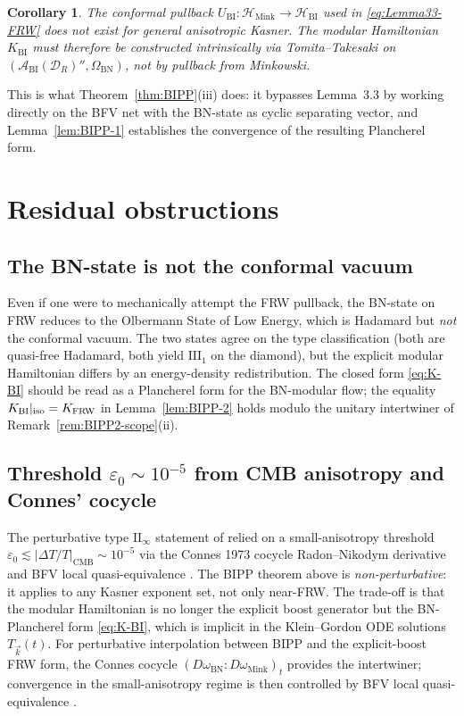 \documentclass[11pt,a4paper]{article}
\newtheorem{corollary}[theorem]{Corollary}
\theoremstyle{definition}
\newcommand{\cA}{\mathcal{A}}
\newcommand{\cH}{\mathcal{H}}
\newcommand{\cD}{\mathcal{D}}
\newcommand{\Mink}{\mathrm{Mink}}
\newcommand{\BI}{\mathrm{BI}}
\newcommand{\FRW}{\mathrm{FRW}}
\newcommand{\BN}{\mathrm{BN}}
\begin{document}
\begin{corollary}\label{cor:no-pullback}
The conformal pullback $U_\BI : \cH_\Mink \to \cH_\BI$ used in
\eqref{eq:Lemma33-FRW} does not exist for general anisotropic Kasner.
The modular Hamiltonian $K_\BI$ must therefore be constructed
intrinsically via Tomita--Takesaki on $(\cA_\BI(\cD_R)'',\Omega_\BN)$,
not by pullback from Minkowski.
\end{corollary}

This is what Theorem~\ref{thm:BIPP}(iii) does: it bypasses Lemma~3.3 by
working directly on the BFV net with the BN-state as cyclic separating
vector, and Lemma~\ref{lem:BIPP-1} establishes the convergence of the
resulting Plancherel form.

\section{Residual obstructions}\label{sec:obstructions}

\subsection{The BN-state is not the conformal vacuum}
Even if one were to mechanically attempt the FRW pullback, the BN-state
on FRW reduces to the Olbermann State of Low Energy, which is Hadamard but
\emph{not} the conformal vacuum. The two states agree on the type
classification (both are quasi-free Hadamard, both yield $\mathrm{III}_1$
on the diamond), but the explicit modular Hamiltonian differs by an
energy-density redistribution. The closed form \eqref{eq:K-BI} should be
read as a Plancherel form for the BN-modular flow; the equality
$K_\BI|_{\rm iso}=K_\FRW$ in Lemma~\ref{lem:BIPP-2} holds modulo the
unitary intertwiner of Remark~\ref{rem:BIPP2-scope}(ii).

\subsection{Threshold $\varepsilon_0 \sim 10^{-5}$ from CMB anisotropy and Connes' cocycle}
The perturbative type $\mathrm{II}_\infty$ statement of
\cite[Prop.~B.1]{ECI-v6-0-22} relied on a small-anisotropy threshold
$\varepsilon_0 \lesssim |\Delta T/T|_\mathrm{CMB} \sim 10^{-5}$ via the
Connes 1973 cocycle Radon--Nikodym derivative \cite{Connes73} and BFV
local quasi-equivalence \cite{BFV03}. The BIPP theorem above is
\emph{non-perturbative}: it applies to any Kasner exponent set, not only
near-FRW. The trade-off is that the modular Hamiltonian is no longer the
explicit boost generator but the BN-Plancherel form \eqref{eq:K-BI},
which is implicit in the Klein--Gordon ODE solutions $T_{\vec k}(t)$.
For perturbative interpolation between BIPP and the explicit-boost FRW
form, the Connes cocycle $(D\omega_\BN:D\omega_\Mink)_t$ provides the
intertwiner; convergence in the small-anisotropy regime is then
controlled by BFV local quasi-equivalence \cite{BFV03}.
\end{document}
